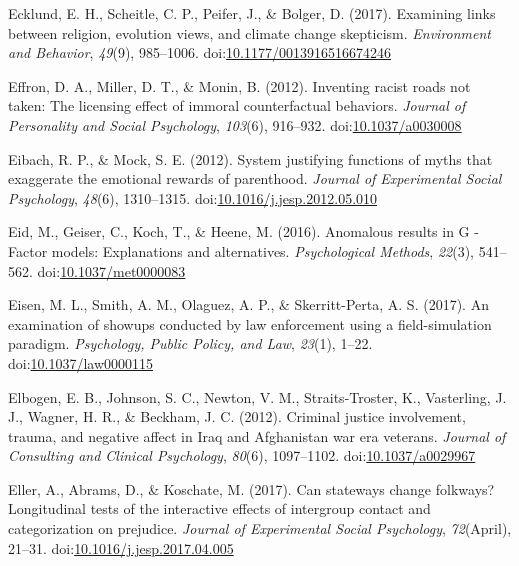 \documentclass[english,man]{apa6}
\theoremstyle{definition}
\theoremstyle{definition}
\theoremstyle{definition}
\theoremstyle{remark}
\begin{document}
\hypertarget{ref-Ecklund2017}{}
Ecklund, E. H., Scheitle, C. P., Peifer, J., \& Bolger, D. (2017).
Examining links between religion, evolution views, and climate change
skepticism. \emph{Environment and Behavior}, \emph{49}(9), 985--1006.
doi:\href{https://doi.org/10.1177/0013916516674246}{10.1177/0013916516674246}

\hypertarget{ref-Effron2012}{}
Effron, D. A., Miller, D. T., \& Monin, B. (2012). Inventing racist
roads not taken: The licensing effect of immoral counterfactual
behaviors. \emph{Journal of Personality and Social Psychology},
\emph{103}(6), 916--932.
doi:\href{https://doi.org/10.1037/a0030008}{10.1037/a0030008}

\hypertarget{ref-Eibach2012}{}
Eibach, R. P., \& Mock, S. E. (2012). System justifying functions of
myths that exaggerate the emotional rewards of parenthood. \emph{Journal
of Experimental Social Psychology}, \emph{48}(6), 1310--1315.
doi:\href{https://doi.org/10.1016/j.jesp.2012.05.010}{10.1016/j.jesp.2012.05.010}

\hypertarget{ref-Eid2016}{}
Eid, M., Geiser, C., Koch, T., \& Heene, M. (2016). Anomalous results in
G -Factor models: Explanations and alternatives. \emph{Psychological
Methods}, \emph{22}(3), 541--562.
doi:\href{https://doi.org/10.1037/met0000083}{10.1037/met0000083}

\hypertarget{ref-Eisen2017}{}
Eisen, M. L., Smith, A. M., Olaguez, A. P., \& Skerritt-Perta, A. S.
(2017). An examination of showups conducted by law enforcement using a
field-simulation paradigm. \emph{Psychology, Public Policy, and Law},
\emph{23}(1), 1--22.
doi:\href{https://doi.org/10.1037/law0000115}{10.1037/law0000115}

\hypertarget{ref-Elbogen2012}{}
Elbogen, E. B., Johnson, S. C., Newton, V. M., Straits-Troster, K.,
Vasterling, J. J., Wagner, H. R., \& Beckham, J. C. (2012). Criminal
justice involvement, trauma, and negative affect in Iraq and Afghanistan
war era veterans. \emph{Journal of Consulting and Clinical Psychology},
\emph{80}(6), 1097--1102.
doi:\href{https://doi.org/10.1037/a0029967}{10.1037/a0029967}

\hypertarget{ref-Eller2017}{}
Eller, A., Abrams, D., \& Koschate, M. (2017). Can stateways change
folkways? Longitudinal tests of the interactive effects of intergroup
contact and categorization on prejudice. \emph{Journal of Experimental
Social Psychology}, \emph{72}(April), 21--31.
doi:\href{https://doi.org/10.1016/j.jesp.2017.04.005}{10.1016/j.jesp.2017.04.005}
\end{document}
